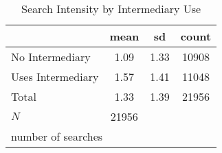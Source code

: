 \begin{table}[htbp]\centering
\def\sym#1{\ifmmode^{#1}\else\(^{#1}\)\fi}
\caption{Search Intensity by Intermediary Use}
\begin{tabular}{l*{1}{ccc}}
\hline\hline
            &        mean&          sd&       count\\
\hline
No Intermediary&        1.09&        1.33&       10908\\
Uses Intermediary&        1.57&        1.41&       11048\\
Total       &        1.33&        1.39&       21956\\
\hline
\(N\)       &       21956&            &            \\
\hline\hline
\multicolumn{4}{l}{\footnotesize number of searches}\\
\end{tabular}
\end{table}
